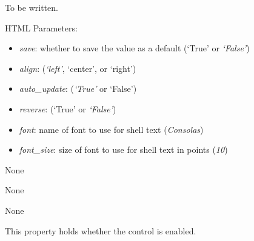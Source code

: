 \documentclass[letterpaper,10pt,english]{sphinxmanual}
\begin{document}
\begin{fulllineitems}
\label{api:controls.TextIOBox}
To be written.

HTML Parameters:
\begin{itemize}
\item {} 
\emph{save}: whether to save the value as a default (`True' or \emph{`False'})

\item {} 
\emph{align}: (\emph{`left'}, `center', or `right')

\item {} 
\emph{auto\_update}: (\emph{`True'} or `False')

\item {} 
\emph{reverse}: (`True' or \emph{`False'})

\item {} 
\emph{font}: name of font to use for shell text (\emph{Consolas})

\item {} 
\emph{font\_size}: size of font to use for shell text in points (\emph{10})

\end{itemize}

\begin{fulllineitems}
\label{api:controls.TextIOBox.action}
None

\end{fulllineitems}


\begin{fulllineitems}
\label{api:controls.TextIOBox.clear}
None

\end{fulllineitems}


\begin{fulllineitems}
\label{api:controls.TextIOBox.close}
None

\end{fulllineitems}


\begin{fulllineitems}
\label{api:controls.TextIOBox.enabled}
This property holds whether the control is enabled.


\end{fulllineitems}
\end{fulllineitems}
\end{document}
